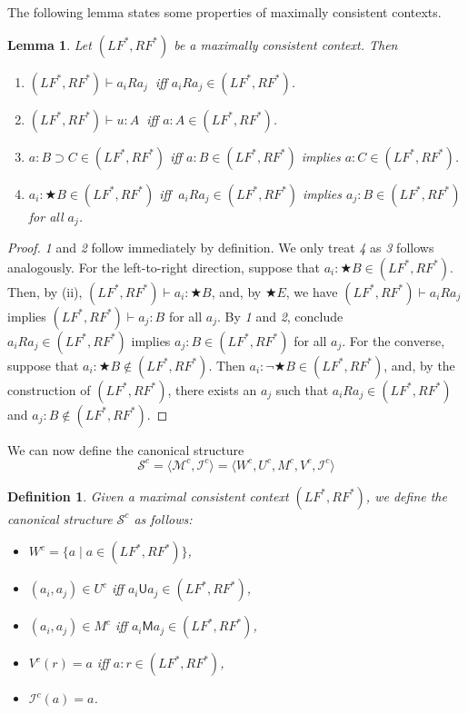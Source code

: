 \documentclass[times, 10pt]{article}
\newcommand{\varimp}{\supset}
\newcommand{\Un}{\textsf{U}}
\newcommand{\Me}{\textsf{M}}
\newtheorem{lemma}{Lemma}
\newtheorem{definition}{Definition}
\renewcommand{\Un}{\mathsf{U}}
\renewcommand{\Me}{\mathsf{M}}
\newcommand{\LF}{\mathit{LF}}
\newcommand{\RF}{\mathit{RF}}
\newcommand{\I}{\mathscr{I}}
\begin{document}
The following lemma states some properties of maximally consistent
contexts.
\begin{lemma}\label{lemma-cs}
  Let $(\LF^*,\RF^*)$ be a maximally consistent context. Then
  \begin{enumerate}
  \item $(\LF^*,\RF^*) \vdash a_i R a_j\ $ iff $a_i R a_j \in (\LF^*,\RF^*)$.
  \item $(\LF^*,\RF^*) \vdash u:A\ $ iff $a:A \in (\LF^*,\RF^*)$.
  \item $a:B \varimp C \in (\LF^*,\RF^*)$ iff $a:B \in (\LF^*,\RF^*)$ implies $a:C \in (\LF^*,\RF^*)$.
  \item $a_i: \bigstar B \in (\LF^*,\RF^*)$ iff $\ a_i R a_j \in (\LF^*,\RF^*)$
    implies $a_j:B \in (\LF^*,\RF^*)$ for all $a_j$.
  \end{enumerate}
\end{lemma}
\begin{proof}
  \emph{1} and \emph{2} follow immediately by definition. We only treat \emph{4} as \emph{3} 
  follows analogously.  For the left-to-right direction, suppose that $a_i: \bigstar B \in (\LF^*,\RF^*)$.  
  Then, by (ii), $(\LF^*,\RF^*) \vdash a_i: \bigstar B$, and, by $\bigstar E$, we have 
  $(\LF^*,\RF^*) \vdash a_i R a_j$ implies $(\LF^*,\RF^*) \vdash a_j:B$ for all $a_j$.  By \emph{1} 
  and \emph{2}, conclude $a_i R a_j \in (\LF^*,\RF^*)$ implies $a_j:B \in (\LF^*,\RF^*)$ for all 
  $a_j$.  For the converse, suppose that $a_i: \bigstar B \not\in (\LF^*,\RF^*)$.  Then 
  $a_i: \neg \bigstar B \in (\LF^*,\RF^*)$, and, by the construction of $(\LF^*,\RF^*)$, there exists 
  an $a_j$ such that $a_i R a_j \in (\LF^*,\RF^*)$ and $a_j:B \not\in (\LF^*,\RF^*)$.
\end{proof}

We can now define the canonical structure 
\begin{displaymath}
\mathscr{S}^c = \langle \mathscr{M}^c, \I^c \rangle = 
\langle W^c, U^c, M^c, V^c, \I^c \rangle
\end{displaymath}
\begin{definition}
  Given a maximal consistent context $(\LF^*,\RF^*)$, we
  define the \emph{canonical structure} $\mathscr{S}^c$ as follows:
  \begin{itemize}
  \item $W^c = \{a \mid a \in (\LF^*,\RF^*)\}$,
  \item $(a_i,a_j) \in U^c$ iff $a_i \Un a_j \in (\LF^*,\RF^*)$,
  \item $(a_i,a_j) \in M^c$ iff $a_i \Me a_j \in (\LF^*,\RF^*)$,
  \item $V^c(r) = a$ iff $a:r \in (\LF^*,\RF^*)$,
  \item $\I^c(a) = a$.
  \end{itemize}
\end{definition}
\end{document}
